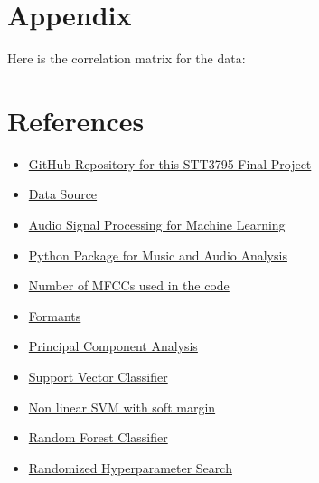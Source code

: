 \documentclass{article}
\begin{document}
\setcounter{page}{10}
\section*{Appendix}
Here is the correlation matrix for the data:\\
\begin{center}
    
\end{center}



\newpage
\section*{References}
\begin{itemize}
    \item \href{https://github.com/Gonxped31/Projet-STT-3795}{GitHub Repository for this STT3795 Final Project}

    \item \href{https://huggingface.co/datasets/common_language}{Data Source}

    \item \href{https://www.youtube.com/playlist?list=PL-wATfeyAMNqIee7cH3q1bh4QJFAaeNv0}{Audio Signal Processing for Machine Learning}

    \item \href{https://librosa.org/doc/latest/index.html}{Python Package for Music and Audio Analysis}

    \item \href{https://ietresearch.onlinelibrary.wiley.com/doi/full/10.1049/tje2.12082#:~:text=All\%20performance\%20metrics\%20gave\%20the,studies\%20use\%20only\%2013\%20MFCCs}{Number of MFCCs used in the code}
    
    \item \href{}{Formants}

    \item \href{https://scikit-learn.org/stable/modules/generated/sklearn.decomposition.PCA.html}{Principal Component Analysis}
    
    \item \href{https://scikit-learn.org/stable/modules/generated/sklearn.svm.SVC.html}{Support Vector Classifier}
    
    \item \href{https://scikit-learn.org/stable/modules/svm.html#svm-kernels}{Non linear SVM with soft margin}
    
    \item \href{https://scikit-learn.org/stable/modules/generated/sklearn.ensemble.RandomForestClassifier.html}{Random Forest Classifier}

    \item \href{https://scikit-learn.org/stable/modules/generated/sklearn.model_selection.RandomizedSearchCV.html}{Randomized Hyperparameter Search}

\end{itemize}
\end{document}
